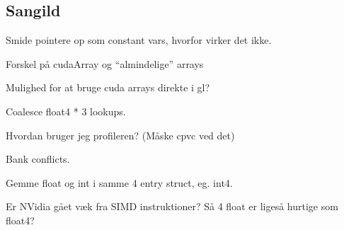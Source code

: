 \subsection*{Sangild}

Smide pointere op som constant vars, hvorfor virker det ikke.

Forskel på cudaArray og ``almindelige'' arrays

Mulighed for at bruge cuda arrays direkte i gl?

Coalesce float4 * 3 lookups.

Hvordan bruger jeg profileren? (Måske cpvc ved det)

Bank conflicts.

Gemme float og int i samme 4 entry struct, eg. int4.

Er NVidia gået væk fra SIMD instruktioner? Så 4 float er ligeså
hurtige som float4?

